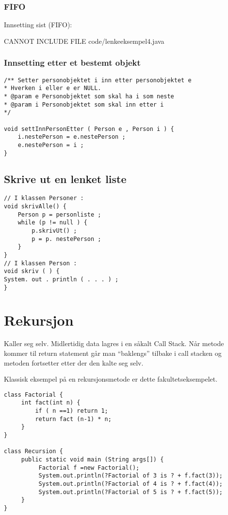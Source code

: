 \documentclass[11pt]{article}
\begin{document}
\subsubsection{FIFO}
\label{sec-8-2-2}

Innsetting sist (FIFO):

CANNOT INCLUDE FILE code/lenkeeksempel4.java
\subsubsection{Innsetting etter et bestemt objekt}
\label{sec-8-2-3}



\begin{verbatim}
/** Setter personobjektet i inn etter personobjektet e
* Hverken i eller e er NULL.
* @param e Personobjektet som skal ha i som neste
* @param i Personobjektet som skal inn etter i
*/

void settInnPersonEtter ( Person e , Person i ) {
    i.nestePerson = e.nestePerson ;
    e.nestePerson = i ;
}
\end{verbatim}
\subsection{Skrive ut en lenket liste}
\label{sec-8-3}



\begin{verbatim}
// I klassen Personer :
void skrivAlle() {
    Person p = personliste ;
    while (p != null ) {
        p.skrivUt() ;
        p = p. nestePerson ;
    }
}
// I klassen Person :
void skriv ( ) {
System. out . println ( . . . ) ;
}
\end{verbatim}
\section{Rekursjon}
\label{sec-9}


Kaller seg selv.
Midlertidig data lagres i en såkalt Call Stack. Når metode kommer til
return statement går man ``baklengs'' tilbake i call stacken og metoden
fortsetter etter der den kalte seg selv.

Klassisk eksempel på en rekursjonsmetode er dette fakultetseksempelet.


\begin{verbatim}
class Factorial {
     int fact(int n) {
         if ( n ==1) return 1;
         return fact (n-1) * n;
     }
}

class Recursion {
     public static void main (String args[]) {
          Factorial f =new Factorial();
          System.out.println(?Factorial of 3 is ? + f.fact(3));
          System.out.println(?Factorial of 4 is ? + f.fact(4));
          System.out.println(?Factorial of 5 is ? + f.fact(5));
     }
}
\end{verbatim}
\end{document}
